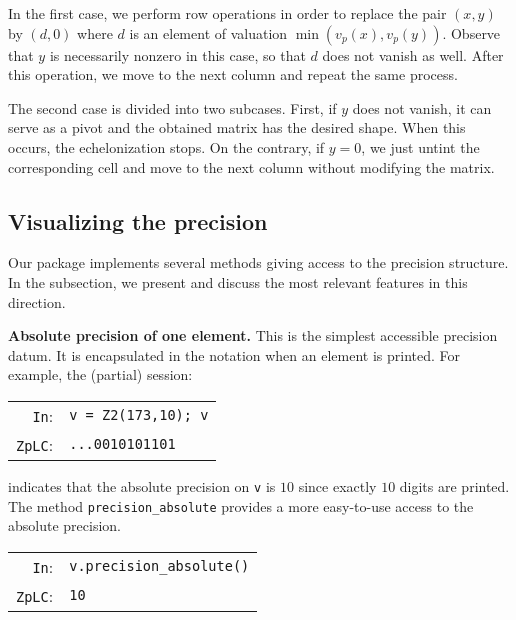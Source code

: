 \documentclass[sigconf]{acmart}
\newcommand{\ttv}{\texttt{v}\xspace}
\newcommand{\cIn}{{\color{input} \tt \phantom{Zp}In}:}
\newcommand{\cZpLC}{{\color{output} \tt ZpLC}:}
\theoremstyle{definition}
\begin{document}
\noindent

In the first case, we perform row operations in order to replace the 
pair $(x,y)$ by $(d, 0)$ where $d$ is an element of valuation 
$\min(v_p(x), v_p(y))$. Observe that $y$ is necessarily nonzero in this case, 
so that $d$ does not vanish as well. After this operation, we move to
the next column and repeat the same process.

The second case is divided into two subcases. First, if $y$ does not 
vanish, it can serve as a pivot and the obtained matrix has the desired 
shape. When this occurs, the echelonization stops. On the contrary, if 
$y = 0$, we just untint the corresponding cell and move to the next 
column without modifying the matrix.

\subsection{Visualizing the precision}
\label{ssec:viewprec}

Our package implements several methods giving access to the precision 
structure. In the subsection, we present and discuss the most relevant 
features in this direction.

\medskip

\noindent \textbf{Absolute precision of one element.}
%
This is the simplest accessible precision datum.
It is encapsulated in the notation when an element is printed. For
example, the (partial) session:

\smallskip

{\noindent \small
\noindent
\begin{tabular}{rl}
\cIn   & \verb?v = ?{\color{ring}\verb?Z2?}\verb?(173,10); v? \\
\cZpLC & \verb?...0010101101?
\end{tabular}}

\smallskip

\noindent
indicates that the absolute precision on \ttv is $10$ since
exactly $10$ digits are printed.
The method {\color{method}\verb?precision_absolute?} provides a more easy-to-use
access to the absolute precision.

\smallskip

{\noindent \small
\noindent
\begin{tabular}{rl}
\cIn   & \verb?v.?{\color{method}\verb?precision_absolute?}\verb?()? \\
\cZpLC & \verb?10?
\end{tabular}}

\smallskip
\end{document}
